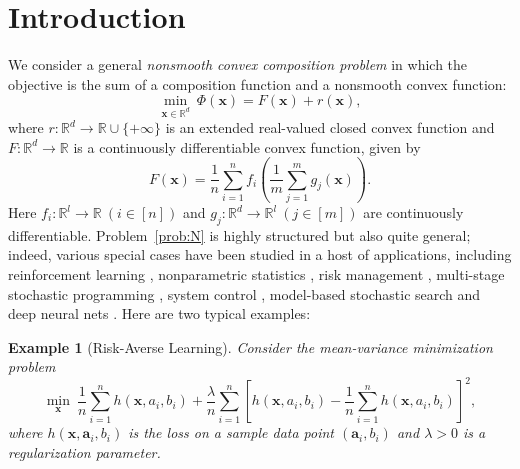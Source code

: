 \documentclass[11pt]{article}
\newtheorem{example}{Example}[section]
\newcommand{\sa}{\mathbf a}
\newcommand{\x}{\mathbf x}
\newcommand{\br}{\mathbb{R}}
\begin{document}
\section{Introduction}\label{sec:introduction}
We consider a general \textit{nonsmooth convex composition problem} in which the objective is the sum of a composition function and a nonsmooth convex function:
\begin{equation}\label{prob:N}
\min_{\x\in\br^d} \ \Phi(\x) = F(\x) + r(\x), 
\end{equation}
where $r: \br^d\rightarrow\br\cup\{+\infty\}$ is an extended real-valued closed convex function and $F: \br^d\rightarrow\br$ is a continuously differentiable convex function, given by
\begin{equation*}
F(\x) = \frac{1}{n}\sum_{i=1}^n f_i\left(\frac{1}{m}\sum_{j=1}^m g_j(\x)\right).
\end{equation*}
Here $f_i:\br^l\rightarrow\br\ (i\in\left[n\right])$ and $g_j:\br^d\rightarrow\br^l \ (j\in\left[m\right])$ are continuously differentiable. Problem~\eqref{prob:N} is highly structured but also quite general; indeed, various special cases have been studied in a host of applications, including reinforcement learning \cite{Sutton-1998-Reinforcement}, nonparametric statistics \cite{Huang-2010-Variable}, risk management \cite{Rockafellar-2000-Optimization}, multi-stage stochastic programming \cite{Shapiro-2009-Lectures}, system control \cite{Kundur-1994-Power}, model-based stochastic search \cite{Hu-2015-Model} and deep neural nets \cite{Goodfellow-2016-Deep, Yang-2018-Multi}. Here are two typical examples:
\begin{example}[Risk-Averse Learning]
Consider the mean-variance minimization problem
\begin{equation*}
\min_{\x} \ \frac{1}{n}\sum_{i=1}^n h(\x, a_i, b_i) + \frac{\lambda}{n}\sum_{i=1}^n \left[h(\x, a_i, b_i) - \frac{1}{n}\sum_{i=1}^n h(\x, a_i, b_i)\right]^2, 
\end{equation*}
where $h(\x, \sa_i, b_i)$ is the loss on a sample data point $\left(\sa_i, b_i\right)$ and $\lambda>0$ is a regularization parameter.
\end{example}
\end{document}
